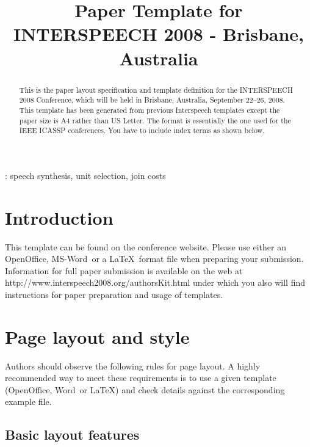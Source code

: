 \documentclass{article}
\title{Paper Template for INTERSPEECH 2008 - Brisbane, Australia}
\def\reg{{\rm\ooalign{\hfil
     \raise.07ex\hbox{\scriptsize R}\hfil\crcr\mathhexbox20D}}}
\begin{document}
\maketitle
%
\begin{abstract}
This is the paper layout specification and template definition 
for the INTERSPEECH 2008 Conference, which will be held in Brisbane, Australia,
September 22--26, 2008. This template has been generated from
previous Interspeech templates except the paper size is A4 rather than US
Letter. The format is essentially the one used for the IEEE
ICASSP conferences. You have to include index terms as shown below.
\end{abstract}
: speech synthesis, unit selection, join costs



%
\section{Introduction}

This template can be found on the conference website. Please use
either an OpenOffice, MS-Word\reg\ or a \LaTeX\ format file when preparing your
submission. Information for full paper submission is available on the
web at http://www.interspeech2008.org/authorsKit.html under which you
also will find instructions for paper preparation and usage of
templates.

\section{Page layout and style}

Authors should observe the following rules for page layout. A
highly recommended way to meet these requirements is to use a given
template (OpenOffice, Word\reg\ or \LaTeX) and check details against the
corresponding example file.

\subsection{Basic layout features}
\end{document}
